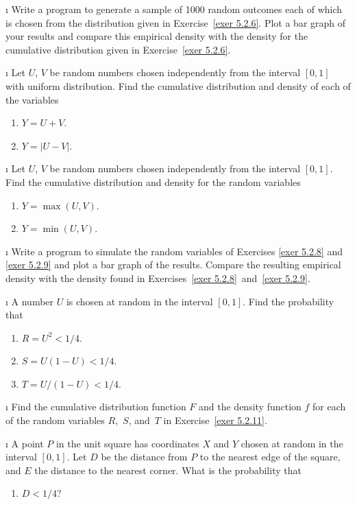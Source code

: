 \begin{LJSItem}
\i\label{5.2.7} Write a program to generate a sample of 1000 random outcomes each
of which is chosen from the distribution given in Exercise~\ref{exer 5.2.6}.  Plot a
bar graph of your results and compare this empirical density with the density for the
cumulative distribution given in Exercise~\ref{exer 5.2.6}.

\i\label{exer 5.2.8} Let $U$, $V$ be random numbers chosen independently from the
interval $[0,1]$ with uniform distribution.  Find the cumulative distribution and density of each
of the variables
\begin{enumerate}
\item $Y = U + V$.

\item $Y = |U - V|$.
\end{enumerate}

\i\label{exer 5.2.9} Let $U$, $V$ be random numbers chosen independently from the
interval
$[0,1]$.  Find the cumulative distribution and density for the random variables
\begin{enumerate}
\item $Y = \max(U,V)$.

\item $Y = \min(U,V)$.
\end{enumerate}

\i\label{exer 5.2.10} Write a program to simulate the random variables of
Exercises \ref{exer 5.2.8} and \ref{exer 5.2.9} and plot a bar graph of the results. 
Compare the resulting empirical density with the density found in Exercises~\ref{exer
5.2.8}~and~\ref{exer 5.2.9}.

\i\label{exer 5.2.11} A number $U$ is chosen at random in the interval
$[0,1]$.  Find the probability that
\begin{enumerate}
\item $R = U^2 < 1/4$.

\item $S = U(1 - U) < 1/4$.

\item $T = U/(1 - U) < 1/4$.
\end{enumerate}

\i\label{exer 5.2.12} Find the cumulative distribution function $F$ and the density function
$f$ for each of the random variables $R$,~$S$, and~$T$ in Exercise~\ref{exer 5.2.11}.

\i\label{exer 5.2.13} A point $P$ in the unit square has coordinates $X$ and
$Y$ chosen at random in the interval $[0,1]$.  Let $D$ be the distance from
$P$ to the nearest edge of the square, and $E$ the distance to the nearest corner. 
What is the probability that 
\begin{enumerate}
\item $D < 1/4$?


\end{enumerate}
\end{LJSItem}
